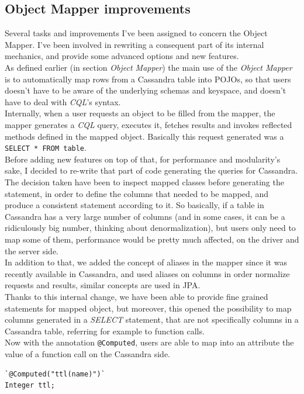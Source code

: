 \documentclass[a4paper]{report}
\begin{document}
\subsection{Object Mapper improvements}
Several tasks and improvements I've been assigned to concern the Object Mapper. I've been involved in rewriting a consequent part of its internal mechanics, and provide some advanced options and new features.\\
As defined earlier (in section \emph{Object Mapper}) the main use of the \emph{Object Mapper} is to automatically map rows from a Cassandra table into POJOs, so that users doesn't have to be aware of the underlying schemas and keyspace, and doesn't have to deal with \emph{CQL}'s syntax. \\
Internally, when a user requests an object to be filled from the mapper, the mapper generates a \emph{CQL} query, executes it, fetches results and invokes reflected methods defined in the mapped object. Basically this request generated was a \verb;SELECT * FROM table;.\\ 
Before adding new features on top of that, for performance and modularity's sake, I decided to re-write that part of code generating the queries for Cassandra. The decision taken have been to inspect mapped classes before generating the statement, in order to define the columns that needed to be mapped, and produce a consistent statement according to it. So basically, if a table in Cassandra has a very large number of columns (and in some cases, it can be a ridiculously big number, thinking about denormalization), but users only need to map some of them, performance would be pretty much affected, on the driver and the server side.\\ 
In addition to that, we added the concept of aliases in the mapper since it was recently available in Cassandra, and used aliases on columns in order normalize requests and results, similar concepts are used in JPA.\\ 
Thanks to this internal change, we have been able to provide fine grained statements for mapped object, but moreover, this opened the possibility to map columns generated in a \emph{SELECT} statement, that are not specifically columns in a Cassandra table, referring for example to function calls.\\
Now with the annotation \verb;@Computed;, users are able to map into an attribute the value of a function call on the Cassandra side. 
\begin{lstlisting}[label=om-ex-2, caption=@Computed on mapped fields, style=Java]
`@Computed("ttl(name)")`
Integer ttl;
\end{lstlisting}
\end{document}
